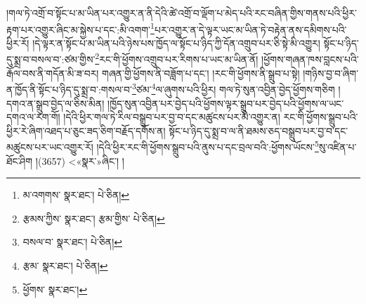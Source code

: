 །གལ་ཏེ་འགྲོ་བ་སྟོང་པ་མ་ཡིན་པར་འགྱུར་ན་ནི་དེའི་ཚེ་འགྲོ་བ་ལྡོག་པ་མེད་པའི་རང་བཞིན་གྱིས་གནས་པའི་ཕྱིར་རྟག་པར་འགྱུར་ཞིང་མ་སྐྱེས་པ་དང་:མི་འགག་\footnote{མ་འགགས་  སྣར་ཐང་།  པེ་ཅིན། }པར་འགྱུར་ན་དེ་ལྟར་ཡང་མ་ཡིན་ཏེ་བརྟེན་ནས་དམིགས་པའི་ཕྱིར་རོ། །དེ་ལྟར་ན་སྟོང་པ་མ་ཡིན་པའི་ཉེས་པས་ཁྱོད་ལ་སྟོང་པ་ཉིད་ཀྱི་དོན་འགྲུབ་པར་ཅི་སྟེ་མི་འགྱུར། སྟོང་པ་ཉིད་དུ་སྨྲ་བ་བསལ་བ་:ཙམ་གྱིས་\footnote{རྩམས་ཀྱིས་  སྣར་ཐང་། རྩམ་གྱིས་  པེ་ཅིན། }རང་གི་ཕྱོགས་འགྲུབ་པར་རིགས་པ་ཡང་མ་ཡིན་ནོ། །ཕྱོགས་གཞན་ཁས་བླངས་པའི་རྒོལ་བས་ནི་གདོན་མི་ཟ་བར། གཞན་གྱི་ཕྱོགས་ནི་བཟློག་པ་དང་། །རང་གི་ཕྱོགས་ནི་སྒྲུབ་པ་སྟེ། །གཉིས་བྱ་བ་ཞིག་ན་ཁྱོད་ནི་སྟོང་པ་ཉིད་དུ་སྨྲ་བ་:གསལ་བ་\footnote{བསལ་བ་  སྣར་ཐང་།  པེ་ཅིན། }ཙམ་\footnote{རྩམ་  སྣར་ཐང་།  པེ་ཅིན། }ལ་ཞུགས་པའི་ཕྱིར། གལ་ཏེ་སུན་འབྱིན་བྱེད་ཕྱོགས་གཅིག །དགའ་ན་སྒྲུབ་བྱེད་ལ་ཅིས་མིན། །ཁྱོད་སུན་འབྱིན་པར་བྱེད་པའི་ཕྱོགས་ལྟར་སྒྲུབ་པར་བྱེད་པའི་ཕྱོགས་ལ་ཡང་དགའ་ལ་རག་གོ། །དེའི་ཕྱིར་གལ་ཏེ་རིལ་བསྒྲུབ་པར་བྱ་བ་དང་མཚུངས་པར་མི་འགྱུར་ན། རང་གི་ཕྱོགས་སྒྲུབ་པའི་ཕྱིར་རེ་ཞིག་འཐད་པ་ཅུང་ཟད་ཅིག་བརྗོད་དགོས་ན། སྟོང་པ་ཉིད་དུ་སྨྲ་བ་ལ་ནི་ཐམས་ཅད་བསྒྲུབ་པར་བྱ་བ་དང་མཚུངས་པར་ཡང་འགྱུར་རོ། །དེའི་ཕྱིར་རང་གི་ཕྱོགས་སྒྲུབ་པའི་ནུས་པ་དང་བྲལ་བའི་:ཕྱོགས་ཡོངས་\footnote{ཕྱོགས་  སྣར་ཐང་། }སུ་འཛིན་པ་ཐོང་ཤིག །(3657) <«སྣར་»ཞིང་། །
